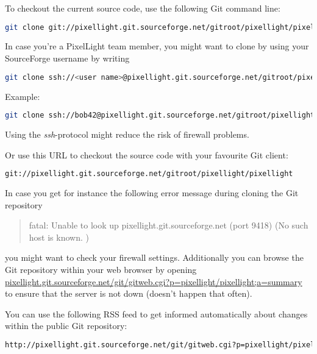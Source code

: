 To checkout the current source code, use the following Git command line:
\begin{lstlisting}[language=sh]
git clone git://pixellight.git.sourceforge.net/gitroot/pixellight/pixellight
\end{lstlisting}

In case you're a PixelLight team member, you might want to clone by using your SourceForge username by writing
\begin{lstlisting}[language=sh]
git clone ssh://<user name>@pixellight.git.sourceforge.net/gitroot/pixellight/pixellight
\end{lstlisting}
Example:
\begin{lstlisting}[language=sh]
git clone ssh://bob42@pixellight.git.sourceforge.net/gitroot/pixellight/pixellight
\end{lstlisting}
Using the \emph{ssh}-protocol might reduce the risk of firewall problems.

Or use this \ac{URL} to checkout the source code with your favourite Git client:
\begin{lstlisting}[language=sh]
git://pixellight.git.sourceforge.net/gitroot/pixellight/pixellight
\end{lstlisting}

In case you get for instance the following error message during cloning the Git repository
\begin{quotation}
fatal: Unable to look up pixellight.git.sourceforge.net (port 9418) (No such host is known. )
\end{quotation}
you might want to check your firewall settings. Additionally you can browse the Git repository within your web browser by opening  \url{pixellight.git.sourceforge.net/git/gitweb.cgi?p=pixellight/pixellight;a=summary} to ensure that the server is not down (doesn't happen that often).

You can use the following \ac{RSS} feed to get informed automatically about changes within the public Git repository:
\begin{lstlisting}[language=sh]
http://pixellight.git.sourceforge.net/git/gitweb.cgi?p=pixellight/pixellight;a=rss
\end{lstlisting}
